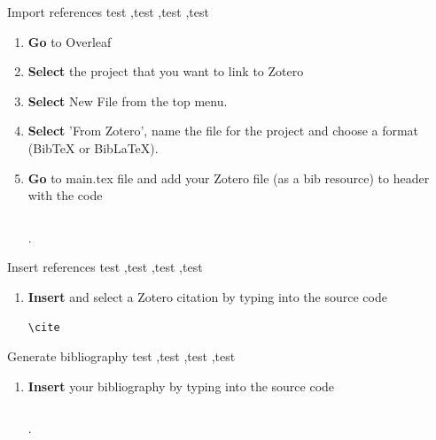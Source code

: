 \documentclass[10pt,a4paper]{article}
\begin{document}
 
 \begin{textbox}{Import references}
test  \sep test \sep test \sep test

\bigskip

\begin{enumerate}
\item \textbf {Go} to Overleaf 
\item \textbf {Select} the project that you want to link to Zotero
\item \textbf {Select} New File from the top menu.
\item \textbf {Select} 'From Zotero', name the file for the project and choose a format (BibTeX or BibLaTeX).
\item \textbf {Go} to main.tex file and add your Zotero file (as a bib resource) to header with the code \begin{verbatim}   \end{verbatim}.
\end{enumerate}

\end{textbox}

  \begin{textbox}{Insert references}
test  \sep test \sep test \sep test

\bigskip

\begin{enumerate}
\item \textbf{Insert} and select a Zotero citation by typing into the source code \begin{verbatim}\cite\end{verbatim}
\end{enumerate}

\end{textbox}

 \begin{textbox}{Generate bibliography}
test  \sep test \sep test \sep test

\bigskip

\begin{enumerate}
\item \textbf{Insert} your bibliography by typing into the source code \begin{verbatim} \end{verbatim}.
\end{enumerate}

\end{textbox}
\end{document}
